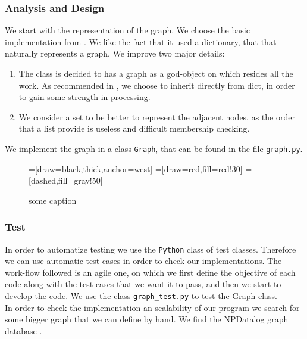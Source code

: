 \subsubsection{Analysis and Design}

We start with the representation of the graph. We choose the basic implementation from \cite{graphAdvanced}. We like the fact that it used a dictionary, that that naturally represents a graph. We improve two major details:
  \begin{enumerate}
  \item The class is decided to has a graph as a god-object on which resides all the work. As recommended in \cite{slatkin2019effective}, we choose to inherit directly from dict, in order to gain some strength in processing.
  \item We consider a set to be better to represent the adjacent nodes, as the order that a list provide is useless and difficult membership checking.
  \end{enumerate}

  We implement the graph in a class \texttt{Graph}, that can be found in the file \texttt{graph.py}.


\begin{figure}[h]
\begin{center}
=[draw=black,thick,anchor=west]
=[draw=red,fill=red!30]
=[dashed,fill=gray!50]
  \caption{some caption}
  \end{center}
\end{figure}

\subsubsection{Test}

In order to automatize testing we use the \texttt{Python} class of test classes. Therefore we can use automatic test cases in order to check our implementations. The work-flow followed is an agile one, on which we first define the objective of each code along with the test cases that we want it to pass, and then we start to develop the code. 
We use the class \texttt{graph\_test.py} to test the Graph class. \\

In order to check the implementation an scalability of our program we search for some bigger graph that we can define by hand. We find the NPDatalog graph database \cite{NPDatalog}.